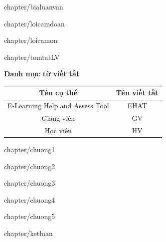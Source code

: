 \documentclass[12pt, a4paper, reqno, oneside]{report}
\begin{document}
	\makeatletter
	\renewcommand{\ps@myheadings}{
		\renewcommand{\@oddhead}{\textsf{Luận văn tốt nghiệp - công nghệ thông tin}\hfil\textrm{\thepage}}
		\renewcommand{\@oddfoot}{\textsf{Phan Minh Cường, Khoa Khoa học \& Kỹ thuật máy tính}\hfil}
	}
	
	\newpage
	 {chapter/bialuanvan}
	
	\newpage
	 {chapter/loicamdoan}
	
	\newpage
	 {chapter/loicamon}
	
	\newpage
	 {chapter/tomtatLV}
	
	\newpage
	\tableofcontents
	
	\newpage
	{\huge\bf Danh mục từ viết tắt} 
	
	\begin{center}
		\begin{table}[!htp]
			\centering
			\begin{tabular}{|c|c|}
				\hline 
				Tên cụ thể & Tên viết tắt \\ 
				\hline 
				E-Learning Help and Assess Tool & EHAT \\ 
				\hline 
				Giảng viên & GV \\ 
				\hline 
				Học viên & HV \\ 
				\hline 
			\end{tabular}
			\label{bang}
		\end{table}
	\end{center}
	
	\newpage
	\listoftables
	
	\newpage
	\listoffigures

	\newpage
	 {chapter/chuong1}
	
	\newpage
	 {chapter/chuong2}
	
	\newpage
	 {chapter/chuong3}
	
	\newpage
	 {chapter/chuong4}
	
	\newpage
	 {chapter/chuong5}
	
	\newpage
	 {chapter/ketluan}
	
	\clearpage
	\printbibliography
	
	\clearpage
	
	
\end{document}
